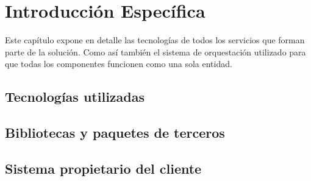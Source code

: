 \chapter{Introducción Específica}
\label{Chapter2}

Este capítulo expone en detalle las tecnologías de todos los servicios que forman parte de la solución. Como así también el sistema de orquestación utilizado para que todas los componentes funcionen como una sola entidad.

	\section{Tecnologías utilizadas}
	
	\section{Bibliotecas y paquetes de terceros}
	
	\section{Sistema propietario del cliente}